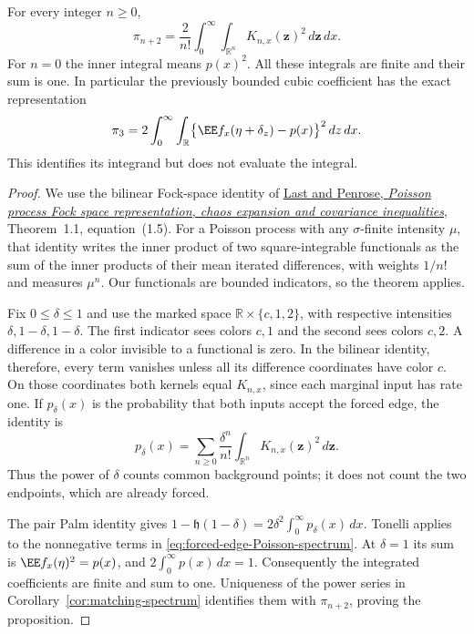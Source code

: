 \documentclass[11pt,letterpaper]{article}
\begin{document}
\begin{proposition}
\label{prop:matching-Poisson-spectrum}
For every integer $n\ge0$,
\begin{equation}\label{eq:matching-Poisson-spectrum}
 \pi_{n+2}
   =\frac2{n!}\int_0^\infty
                  \int_{\mathbb R^n}K_{n,x}(\boldsymbol z)^2
                                      \,d\boldsymbol z\,dx.
\end{equation}
For $n=0$ the inner integral means $p(x)^2$.
All these integrals are finite and their sum is one.
In particular the previously bounded cubic coefficient has the
exact representation
\begin{equation}\label{eq:matching-cubic-integral}
 \pi_3=2\int_0^\infty\int_{\mathbb R}
          \bigl\{\EE f_x(\eta+\delta_z)-p(x)\bigr\}^2\,dz\,dx.
\end{equation}
This identifies its integrand but does not evaluate the integral.
\end{proposition}
\begin{proof}
We use the bilinear Fock-space identity of
\href{https://arxiv.org/pdf/0909.3205}{Last and Penrose,
\emph{Poisson process Fock space representation, chaos expansion
and covariance inequalities}}, Theorem~1.1, equation~(1.5).
For a Poisson process with any $\sigma$-finite intensity $\mu$,
that identity writes the inner product of two square-integrable
functionals as the sum of the inner products of their mean
iterated differences, with weights $1/n!$ and measures $\mu^n$.
Our functionals are bounded indicators, so the theorem applies.

Fix $0\le\delta\le1$ and use the marked space
$\mathbb R\times\{c,1,2\}$, with respective intensities
$\delta,1-\delta,1-\delta$.
The first indicator sees colors $c,1$ and the second sees
colors $c,2$. A difference in a color invisible to a functional
is zero. In the bilinear identity, therefore, every term
vanishes unless all its difference coordinates have color $c$.
On those coordinates both kernels equal $K_{n,x}$, since
each marginal input has rate one. If $p_\delta(x)$ is the
probability that both inputs accept the forced edge, the identity is
\begin{equation}\label{eq:forced-edge-Poisson-spectrum}
 p_\delta(x)=
   \sum_{n\ge0}\frac{\delta^n}{n!}
          \int_{\mathbb R^n}K_{n,x}(\boldsymbol z)^2
                                      \,d\boldsymbol z.
\end{equation}
Thus the power of $\delta$ counts common background points;
it does not count the two endpoints, which are already forced.

The pair Palm identity gives
$1-\mathfrak h(1-\delta)=2\delta^2\int_0^\infty p_\delta(x)\,dx$.
Tonelli applies to the nonnegative terms in
\eqref{eq:forced-edge-Poisson-spectrum}.
At $\delta=1$ its sum is
$\EE f_x(\eta)^2=p(x)$, and $2\int_0^\infty p(x)\,dx=1$.
Consequently the integrated coefficients are finite and sum
to one. Uniqueness of the power series in
Corollary~\ref{cor:matching-spectrum} identifies them with
$\pi_{n+2}$, proving the proposition.
\end{proof}
\end{document}
